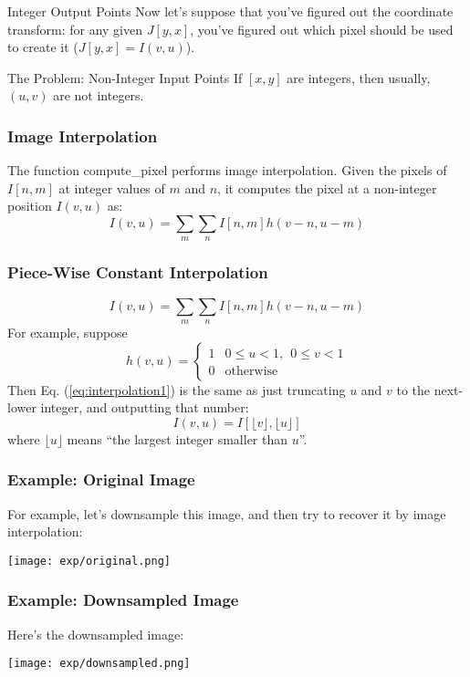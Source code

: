 \documentclass{beamer}
\begin{document}
\begin{frame}
  \begin{block}{Integer Output Points}
    Now let's suppose that you've figured out the coordinate transform:
    for any given $J[y,x]$, you've figured out which pixel should be used to create it 
    ($J[y,x]=I(v,u)$).
    
  \end{block}
  \begin{block}{The Problem: Non-Integer Input Points}
    If $[x,y]$ are integers, then usually, $(u,v)$ are not integers.
  \end{block}
\end{frame}

\begin{frame}
  \frametitle{Image Interpolation}
  The function compute\_pixel performs image interpolation.
  Given the pixels of $I[n,m]$ at integer values of $m$ and $n$, it computes
  the pixel at a non-integer position $I(v,u)$ as:
  \[
  I(v,u) = \sum_m\sum_n I[n,m] h(v-n,u-m)
  \]
\end{frame}

\begin{frame}
  \frametitle{Piece-Wise Constant Interpolation}
  \begin{equation}
  I(v,u) = \sum_m\sum_n I[n,m] h(v-n,u-m)
  \label{eq:interpolation1}
  \end{equation}
  For example, suppose
  \[
  h(v,u) = \left\{\begin{array}{ll}
  1 & 0\le u<1,~~0\le v<1\\
  0 & \mbox{otherwise}
  \end{array}\right.
  \]
  Then Eq. (\ref{eq:interpolation1}) is the same as just truncating $u$
  and $v$ to the next-lower integer, and outputting that number:
  \[
  I(v,u) = I\left[\lfloor v\rfloor,\lfloor u\rfloor\right]
  \]
  where $\lfloor u\rfloor$ means ``the largest integer smaller than $u$''.
\end{frame}

\begin{frame}
  \frametitle{Example: Original Image}
  For example, let's downsample this image, and then try to recover it by image interpolation:
  \centerline{\texttt{[image: exp/original.png]}}
\end{frame}

\begin{frame}
  \frametitle{Example: Downsampled Image}
  Here's the downsampled image:
  \centerline{\texttt{[image: exp/downsampled.png]}}
\end{frame}
\end{document}
